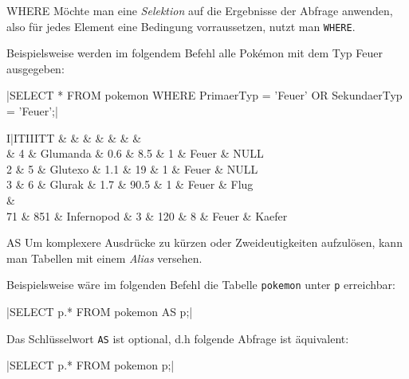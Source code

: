 \begin{sql}{WHERE}
    Möchte man eine \emph{Selektion} auf die Ergebnisse der Abfrage anwenden, also für jedes Element eine Bedingung vorraussetzen, nutzt man \texttt{WHERE}.

    Beispielsweise werden im folgendem Befehl alle Pokémon mit dem Typ Feuer ausgegeben:

    |SELECT * FROM pokemon WHERE PrimaerTyp = 'Feuer' OR SekundaerTyp = 'Feuer';|

    \begin{tabular}{I|ITIIITT}
        &  &  &  &  &  &  &  \\ & 4 & Glumanda & 0.6 & 8.5 & 1 & Feuer & NULL \\
        2 & 5 & Glutexo & 1.1 & 19 & 1 & Feuer & NULL \\
        3 & 6 & Glurak & 1.7 & 90.5 & 1 & Feuer & Flug \\
         &  \\
        71 & 851 & Infernopod & 3 & 120 & 8 & Feuer & Kaefer \\
    \end{tabular}
\end{sql}

\begin{sql}{AS}
    Um komplexere Ausdrücke zu kürzen oder Zweideutigkeiten aufzulösen, kann man Tabellen mit einem \emph{Alias} versehen.

    Beispielsweise wäre im folgenden Befehl die Tabelle \texttt{pokemon} unter \texttt{p} erreichbar:

    |SELECT p.* FROM pokemon AS p;|

    Das Schlüsselwort \texttt{AS} ist optional, d.h folgende Abfrage ist äquivalent:
    
    |SELECT p.* FROM pokemon p;|
\end{sql}

